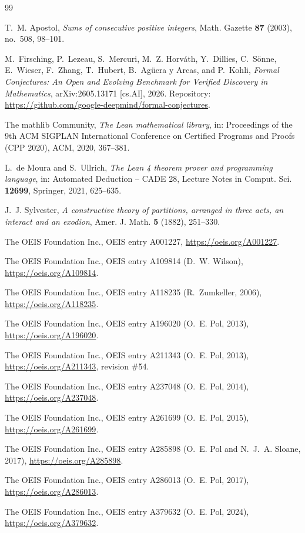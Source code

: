 \documentclass[11pt]{amsart}
\theoremstyle{plain}
\theoremstyle{definition}
\begin{document}
{\small
\begin{thebibliography}{99}

T.~M. Apostol, \emph{Sums of consecutive positive integers}, Math. Gazette \textbf{87} (2003), no.~508, 98--101.

M.~Firsching, P.~Lezeau, S.~Mercuri, M.~Z. Horv\'ath, Y.~Dillies, C.~S\"onne, E.~Wieser, F.~Zhang, T.~Hubert, B.~Ag\"uera y Arcas, and P.~Kohli, \emph{Formal Conjectures: An Open and Evolving Benchmark for Verified Discovery in Mathematics}, arXiv:2605.13171 [cs.AI], 2026. Repository: \url{https://github.com/google-deepmind/formal-conjectures}.

The mathlib Community, \emph{The Lean mathematical library}, in: Proceedings of the 9th ACM SIGPLAN International Conference on Certified Programs and Proofs (CPP 2020), ACM, 2020, 367--381.

L.~de Moura and S.~Ullrich, \emph{The Lean 4 theorem prover and programming language}, in: Automated Deduction -- CADE 28, Lecture Notes in Comput. Sci. \textbf{12699}, Springer, 2021, 625--635.

J.~J. Sylvester, \emph{A constructive theory of partitions, arranged in three acts, an interact and an exodion}, Amer. J. Math. \textbf{5} (1882), 251--330.

The OEIS Foundation Inc., OEIS entry A001227, \url{https://oeis.org/A001227}.

The OEIS Foundation Inc., OEIS entry A109814 (D.~W. Wilson), \url{https://oeis.org/A109814}.

The OEIS Foundation Inc., OEIS entry A118235 (R.~Zumkeller, 2006), \url{https://oeis.org/A118235}.

The OEIS Foundation Inc., OEIS entry A196020 (O.~E. Pol, 2013), \url{https://oeis.org/A196020}.

The OEIS Foundation Inc., OEIS entry A211343 (O.~E. Pol, 2013), \url{https://oeis.org/A211343}, revision \#54.

The OEIS Foundation Inc., OEIS entry A237048 (O.~E. Pol, 2014), \url{https://oeis.org/A237048}.

The OEIS Foundation Inc., OEIS entry A261699 (O.~E. Pol, 2015), \url{https://oeis.org/A261699}.

The OEIS Foundation Inc., OEIS entry A285898 (O.~E. Pol and N.~J.~A. Sloane, 2017), \url{https://oeis.org/A285898}.

The OEIS Foundation Inc., OEIS entry A286013 (O.~E. Pol, 2017), \url{https://oeis.org/A286013}.

The OEIS Foundation Inc., OEIS entry A379632 (O.~E. Pol, 2024), \url{https://oeis.org/A379632}.

\end{thebibliography}
}
\end{document}
